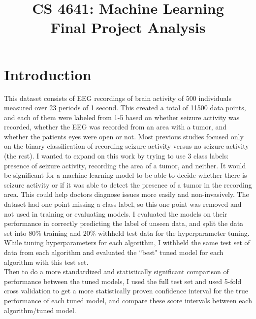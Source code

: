 \documentclass{article}
\title{CS 4641: Machine Learning\\
Final Project Analysis}
\date{}
\author{}
\begin{document}
\maketitle
\section*{Introduction}
This dataset consists of EEG recordings of brain activity of 500 individuals measured over 23 periods of 1 second. This created a total of 11500 data points, and each of them were labeled from 1-5 based on whether seizure activity was recorded, whether the EEG was recorded from an area with a tumor, and  whether the patients eyes were open or not. Most previous studies focused only on the binary classification of recording seizure activity versus no seizure activity (the rest). I wanted to expand on this work by trying to use 3 class labels: presence of seizure activity, recording the area of a tumor, and neither. It would be significant for a machine learning model to be able to decide whether there is seizure activity or if it was able to detect the presence of a tumor in the recording area. This could help doctors diagnose issues more easily and non-invasively. The dataset had one point missing a class label, so this one point was removed and not used in training or evaluating models. I  evaluated the models on their performance in correctly predicting the label of unseen data, and split the data set into 80\% training and 20\% withheld test data for the hyperparameter tuning. While tuning hyperparameters for each algorithm, I withheld the same test set of data from each algorithm and evaluated the ``best" tuned model for each algorithm with this test set. 
\bigskip \\Then to do a more standardized and statistically significant comparison of performance between the tuned models, I used the full test set and used 5-fold cross validation to get a more statistically proven confidence interval for the true performance of each tuned model, and compare these score intervals between each algorithm/tuned model.
\end{document}
